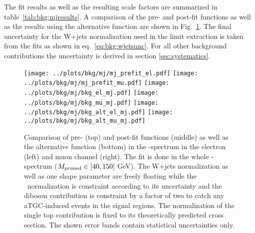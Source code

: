 \noindent The fit results as well as the resulting scale factors are summarized in table~\ref{tab:bkg:mjresults}. A comparison of the pre- and post-fit functions as well as the results using the alternative function are shown in Fig.~\ref{fig:bkg:mjdata}. The final uncertainty for the W+jets normalization used in the limit extraction is taken from the fits as shown in eq.~\ref{eq:bkg:wjetsunc}. For all other background contributions the uncertainty is derived in section \ref{sec:systematics}.
\begin{figure}
	\centering
		\texttt{[image: ../plots/bkg/mj/mj\_prefit\_el.pdf]}		
		\texttt{[image: ../plots/bkg/mj/mj\_prefit\_mu.pdf]}
		\texttt{[image: ../plots/bkg/mj/bkg\_el\_mj.pdf]}
		\texttt{[image: ../plots/bkg/mj/bkg\_mu\_mj.pdf]}	
		\texttt{[image: ../plots/bkg/mj/bkg\_alt\_el\_mj.pdf]}
		\texttt{[image: ../plots/bkg/mj/bkg\_alt\_mu\_mj.pdf]}
	\caption[Comparison of pre- and post-fit functions and the alternative function in the \Mpr -spectrum]{Comparison of pre- (top) and post-fit functions (middle) as well as the alternative function (bottom) in the \Mpr -spectrum in the electron (left) and muon channel (right). The fit is done in the whole \Mpr -spectrum ($M_\mathrm{pruned} \in [40,150] $ GeV). The W+jets normalization as well as one shape parameter are freely floating while the \ttbar \ normalization is constraint according to its uncertainty and the diboson contribution is constraint by a factor of two to catch any  aTGC-induced events in the signal regions. The normalization of the single top contribution is fixed to its theoretically predicted cross section. The shown error bands contain statistical uncertainties only.}
	\label{fig:bkg:mjdata}
\end{figure}

